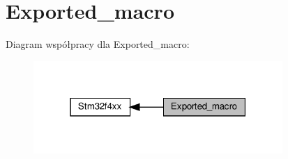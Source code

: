 \hypertarget{group___exported__macro}{}\section{Exported\+\_\+macro}
\label{group___exported__macro}
Diagram współpracy dla Exported\+\_\+macro\+:\nopagebreak
\begin{figure}[H]
\begin{center}
\leavevmode
\includegraphics[width=268pt]{group___exported__macro}
\end{center}
\end{figure}
